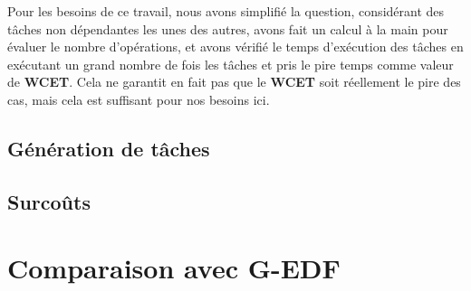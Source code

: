 Pour les besoins de ce travail, nous avons simplifié la question, considérant des tâches 
non dépendantes les unes des autres, avons fait un calcul à la main pour évaluer le 
nombre d'opérations, et avons vérifié le temps d'exécution des tâches en exécutant un grand nombre 
de fois les tâches et pris le pire temps comme valeur de \textbf{WCET}. Cela ne garantit en fait 
pas que le \textbf{WCET} soit réellement le pire des cas, mais cela est suffisant pour nos besoins ici.

\subsection{Génération de tâches}



\subsection{Surcoûts}

\section{Comparaison avec G-EDF}
